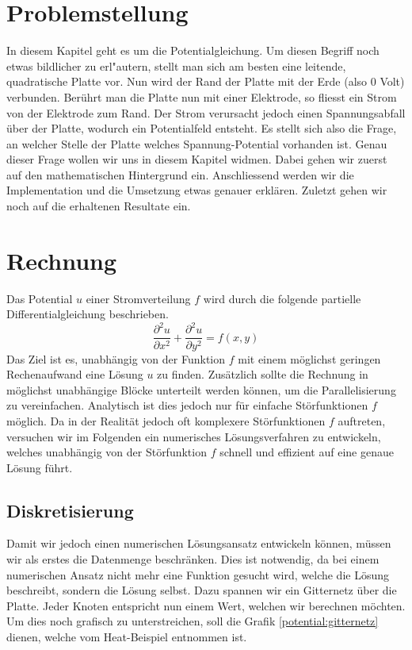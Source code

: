 \begin{refsection}
\section{Problemstellung}
In diesem Kapitel geht es um die Potentialgleichung. Um diesen Begriff
noch etwas bildlicher zu erl"autern, stellt man sich am besten eine
leitende, quadratische Platte vor. Nun wird der Rand der Platte mit der
Erde (also 0 Volt) verbunden. Ber\"uhrt man die Platte nun mit einer
Elektrode, so fliesst ein Strom von der Elektrode zum Rand. Der Strom
verursacht jedoch einen Spannungsabfall \"uber der Platte, wodurch
ein Potentialfeld entsteht. Es stellt sich also die Frage, an welcher
Stelle der Platte welches Spannung-Potential vorhanden ist. Genau dieser
Frage wollen wir uns in diesem Kapitel widmen. Dabei gehen wir zuerst
auf den mathematischen Hintergrund ein. Anschliessend werden wir die
Implementation und die Umsetzung etwas genauer erkl\"aren. Zuletzt gehen
wir noch auf die erhaltenen Resultate ein.

\section{Rechnung}
Das Potential $u$ einer Stromverteilung $f$ wird durch die folgende
partielle Differentialgleichung beschrieben.
\begin{equation}\label{eq:gleichung}
\dfrac{\partial^2 u}{\partial x^2}+\dfrac{\partial^2 u}{\partial y^2} =f(x,y)
\end{equation}
Das Ziel ist es, unabh\"angig von der Funktion $f$ mit einem m\"oglichst
geringen Rechenaufwand eine L\"osung $u$ zu finden. Zus\"atzlich sollte
die Rechnung in m\"oglichst unabh\"angige Bl\"ocke unterteilt werden
k\"onnen, um die Parallelisierung zu vereinfachen. Analytisch ist dies
jedoch nur f\"ur einfache St\"orfunktionen $f$ m\"oglich. Da in der
Realit\"at jedoch oft komplexere St\"orfunktionen $f$ auftreten, versuchen
wir im Folgenden ein numerisches L\"osungsverfahren zu entwickeln,
welches unabh\"angig von der St\"orfunktion $f$ schnell und effizient
auf eine genaue L\"osung f\"uhrt.


\subsection{Diskretisierung}
Damit wir jedoch einen numerischen L\"osungsansatz entwickeln k\"onnen,
m\"ussen wir als erstes die Datenmenge beschr\"anken. Dies ist notwendig,
da bei einem numerischen Ansatz nicht mehr eine Funktion gesucht wird,
welche die L\"osung beschreibt, sondern die L\"osung selbst. Dazu
spannen wir ein Gitternetz \"uber die Platte. Jeder Knoten entspricht
nun einem Wert, welchen wir berechnen m\"ochten. Um dies noch grafisch zu
unterstreichen, soll die Grafik \ref{potential:gitternetz} dienen,
welche vom Heat-Beispiel
entnommen ist. 


\end{refsection}

